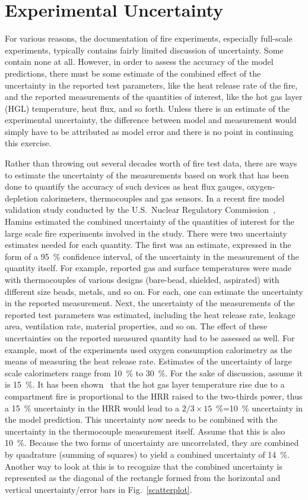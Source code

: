 \section{Experimental Uncertainty}

For various reasons, the documentation of fire experiments, especially full-scale experiments,
typically contains fairly limited discussion of uncertainty. Some contain none at all.
However, in order to assess the accuracy of the model predictions, there must be some estimate of the
combined effect of the uncertainty in the reported test parameters, like the heat release rate of the fire,
and the reported measurements of the quantities of interest, like the hot gas layer (HGL)
temperature, heat flux, and so forth. Unless there is an estimate of the experimental uncertainty,
the difference between model and measurement
would simply have to be attributed as model error and there is no point in
continuing this exercise.

Rather than throwing out several decades worth of fire test data, there are ways to estimate the uncertainty of the measurements based on work
that has been done to quantify the accuracy of such devices as heat flux gauges, oxygen-depletion calorimeters, thermocouples and gas sensors.
In a recent fire model validation study conducted by the U.S.~Nuclear Regulatory Commission~\cite{NUREG_1824}, Hamins estimated the combined
uncertainty of the quantities of interest for the large scale fire experiments involved in the study. There were
two uncertainty estimates needed for each quantity. The first was an estimate, expressed in the form of a 95~\% confidence interval, of the
uncertainty in the measurement of the quantity itself. For example, reported gas and surface temperatures were made with thermocouples of various designs (bare-bead,
shielded, aspirated) with different size beads, metals, and so on. For each, one can estimate the uncertainty in the reported measurement. Next, the
uncertainty of the measurements of the reported test parameters was estimated, including the heat release rate, leakage area, ventilation rate, material
properties, and so on. The effect of these uncertainties on the reported measured quantity had to be assessed as well. For example, most of the
experiments used oxygen consumption calorimetry as the means of measuring the heat release rate.
Estimates of the uncertainty of large scale calorimeters range from 10~\% to 30~\%. For the sake of discussion, assume it is 15~\%.
It has been shown~\cite{SFPE:Walton} that the hot gas layer temperature rise due to
a compartment fire is proportional to the HRR raised to the two-thirds power, thus a 15~\% uncertainty in the HRR would lead to a $2/3 \times 15$~\%=10~\%
uncertainty in the model prediction. This uncertainty now needs to be combined with the uncertainty in the thermocouple measurement itself. Assume that
this is also 10~\%. Because the two forms of uncertainty are uncorrelated, they are combined by quadrature (summing of squares) to yield a combined
uncertainty of 14~\%. Another way to look at this is to recognize that the combined uncertainty is represented as the diagonal of the rectangle formed
from the horizontal and vertical uncertainty/error bars in Fig.~\ref{scatterplot}.

